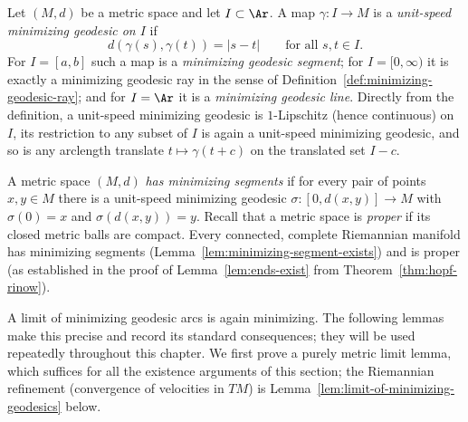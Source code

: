 \begin{definition}
\label{def:minimizing-geodesic-window}
\leanok
{}
Let $(M,d)$ be a metric space and let $I\subset\Ar$. A map
$\gamma\colon I\to M$ is a {\em unit-speed minimizing geodesic on
$I$} if
$$d(\gamma(s),\gamma(t))=|s-t|\qquad\text{for all } s,t\in I.$$
For $I=[a,b]$ such a map is a {\em minimizing geodesic segment}; for
$I=[0,\infty)$ it is exactly a minimizing geodesic ray in the sense
of Definition~\ref{def:minimizing-geodesic-ray}; and for $I=\Ar$ it
is a {\em minimizing geodesic line}. Directly from the definition, a
unit-speed minimizing geodesic is $1$-Lipschitz (hence continuous) on
$I$, its restriction to any subset of $I$ is again a unit-speed
minimizing geodesic, and so is any arclength translate
$t\mapsto\gamma(t+c)$ on the translated set $I-c$.
\end{definition}

\begin{definition}
\label{def:has-min-segments}
\leanok
{}
A metric space $(M,d)$ {\em has minimizing segments} if for every
pair of points $x,y\in M$ there is a unit-speed minimizing geodesic
$\sigma\colon[0,d(x,y)]\to M$ with $\sigma(0)=x$ and
$\sigma(d(x,y))=y$. Recall that a metric space is {\em proper} if its
closed metric balls are compact. Every connected, complete Riemannian
manifold has minimizing segments
(Lemma~\ref{lem:minimizing-segment-exists}) and is proper (as
established in the proof of Lemma~\ref{lem:ends-exist} from
Theorem~\ref{thm:hopf-rinow}).
\end{definition}

A limit of minimizing geodesic arcs is again minimizing. The
following lemmas make this precise and record its standard
consequences; they will be used repeatedly throughout this
chapter. We first prove a purely metric limit lemma, which suffices
for all the existence arguments of this section; the Riemannian
refinement (convergence of velocities in $TM$) is
Lemma~\ref{lem:limit-of-minimizing-geodesics} below.

